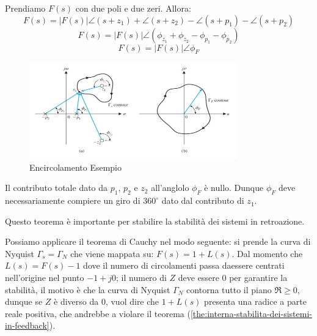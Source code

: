 \documentclass[12pt]{article}
\begin{document}
\begin{example}{}{}
    Prendiamo $F(s)$ con due poli e due zeri. Allora:
\[ F(s) = |F(s)| \angle(s+z_1) + \angle(s+z_2) - \angle(s+p_1) - \angle(s+p_2)  \]
\[ F(s) = |F(s)| \angle(\phi _{z_1} + \phi _{z_2} - \phi _{p_1} - \phi _{p_2})\]
\[ F(s) = |F(s)| \angle\phi_F \]
\begin{figure}[H]
    \centering
    \includegraphics[width=0.8\textwidth]{encircolamento-esempio.png}
    \caption{Encircolamento Esempio}
    \label{fig:encircolamento-esempio}
\end{figure}
Il contributo totale dato da $p_1$, $p_2$ e $z_2$ all'anglolo $\phi_F$ \`e nullo. Dunque $\phi_F$ deve necessariamente compiere un giro di $360^{\circ}$ dato dal contributo di $z_1$.
\end{example}

Questo teorema \`e importante per stabilire la stabilit\`a dei sistemi in retroazione.

Possiamo applicare il teorema di Cauchy nel modo seguente: si prende la curva di Nyquist $\Gamma_s = \Gamma_N$ che viene mappata su: $F(s) = 1 + L(s)$. Dal momento che $L(s) = F(s) - 1$ dove il numero di circolamenti passa daessere centrati nell'origine nel punto $-1 + j0$; il numero di $Z$ deve essere 0 per garantire la stabilit\`a, il motivo \`e che la curva di Nyquist $\Gamma_N$ contorna tutto il piano $\Re \geqslant 0$, dunque se $Z$ \`e diverso da 0, vuol dire che $1 + L(s)$ presenta una radice a parte reale positiva, che andrebbe a violare il teorema (\ref{the:interna-stabilita-dei-sistemi-in-feedback}).
\end{document}
